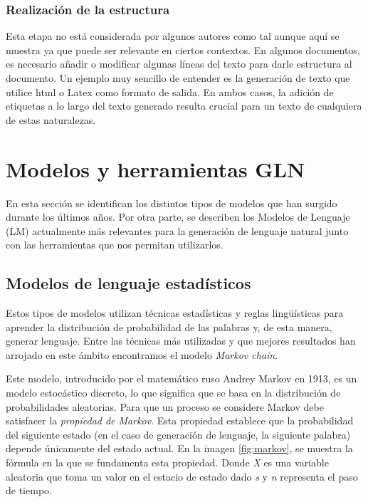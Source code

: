 \subsubsection{Realización de la estructura}
Esta etapa no está considerada por algunos autores como tal aunque aquí se muestra ya que puede ser relevante en ciertos contextos. 
En algunos documentos, es necesario añadir o modificar algunas líneas del texto para darle estructura al documento. Un ejemplo muy sencillo de entender es la generación de texto que utilice html o Latex como formato de salida. En ambos casos, la adición de etiquetas a lo largo del texto generado resulta crucial para un texto de cualquiera de estas naturalezas.


\section{Modelos y herramientas GLN}
\label{sec:modelos}
En esta sección se identifican los distintos tipos de modelos que han surgido durante los últimos años. Por otra parte, se describen los Modelos de Lenguaje (LM) actualmente más relevantes para la generación de lenguaje natural junto con las herramientas que nos permitan utilizarlos.

\subsection{Modelos de lenguaje estadísticos}
Estos tipos de modelos utilizan técnicas estadísticas y reglas lingüísticas para aprender la distribución de probabilidad de las palabras y, de esta manera, generar lenguaje. Entre las técnicas más utilizadas y que mejores resultados han arrojado en este ámbito encontramos el modelo \textit{Markov chain}.



Este modelo, introducido por el matemático ruso Andrey Markov en 1913, es un modelo estocástico discreto, lo que significa que se basa en la distribución de probabilidades aleatorias. Para que un proceso se considere Markov debe satisfacer la \textit{propiedad de Markov}. Esta propiedad establece que  la probabilidad del siguiente estado (en el caso de generación de lenguaje, la siguiente palabra) depende únicamente del estado actual. En la imagen \ref{fig:markov}, se muestra la fórmula en la que se fundamenta esta propiedad. Donde \textit{X} es una variable aleatoria que toma un valor en el estacio de estado dado \textit{s} y \textit{n} representa el paso de tiempo\citep{howell_2022}. 

